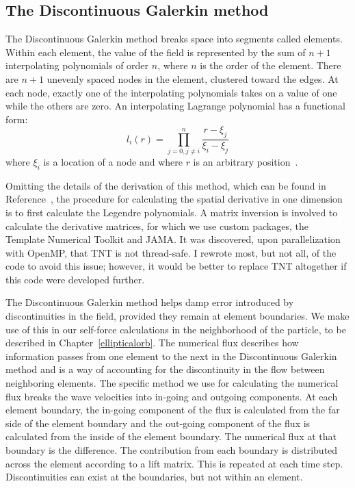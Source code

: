 \subsection{The Discontinuous Galerkin method}
The Discontinuous Galerkin method breaks space into segments called elements. Within each element, the value of the field is represented by the sum of $n+1$ interpolating polynomials of order $n$, where $n$ is the order of the element. There are $n+1$ unevenly spaced nodes in the element, clustered toward the edges. At each node, exactly one of the interpolating polynomials takes on a value of one while the others are zero. An interpolating Lagrange polynomial has a functional form:
\begin{equation}
  l_i(r)=\prod_{j=0,j\ne i}^{n}\frac{r-\xi_j}{\xi_i-\xi_j}
\end{equation}
where $\xi_i$ is a location of a node and where $r$ is an arbitrary position~\cite{dghesthaven}. 


Omitting the details of the derivation of this method, which can be found in Reference~\cite{dghesthaven}, the procedure for calculating the spatial derivative in one dimension is to first calculate the Legendre polynomials. A matrix inversion is involved to calculate the derivative matrices, for which we use custom packages, the Template Numerical Toolkit and JAMA. It was discovered, upon parallelization with OpenMP, that TNT is not thread-safe. I rewrote most, but not all, of the code to avoid this issue; however, it would be better to replace TNT altogether if this code were developed further.

The Discontinuous Galerkin method helps damp error introduced by discontinuities in the field, provided they remain at element boundaries. We make use of this in our self-force calculations in the neighborhood of the particle, to be described in Chapter~\ref{ellipticalorb}. The numerical flux describes how information passes from one element to the next in the Discontinuous Galerkin method and is a way of accounting for the discontinuity in the flow between neighboring elements. The specific method we use for calculating the numerical flux breaks the wave velocities into in-going and outgoing components. At each element boundary, the in-going component of the flux is calculated from the far side of the element boundary and the out-going component of the flux is calculated from the inside of the element boundary. The numerical flux at that boundary is the difference. The contribution from each boundary is distributed across the element according to a lift matrix. This is repeated at each time step. Discontinuities can exist at the boundaries, but not within an element. 



